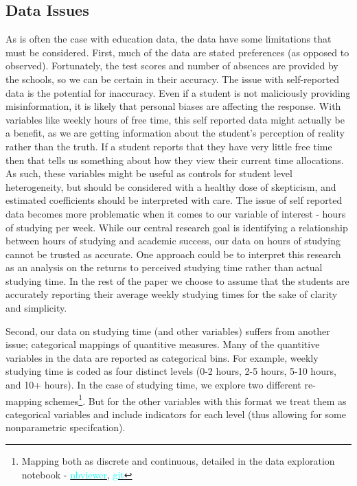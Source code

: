 \documentclass[12pt]{article}
\begin{document}
\subsection{Data Issues} \label{data_issues}
As is often the case with education data, the data have some limitations that must be considered. First, much of the data are stated preferences (as opposed to observed). Fortunately, the test scores and number of absences are provided by the schools, so we can be certain in their accuracy. The issue with self-reported data is the potential for inaccuracy. Even if a student is not maliciously providing misinformation, it is likely that personal biases are affecting the response. With variables like weekly hours of free time, this self reported data might actually be a benefit, as we are getting information about the student's perception of reality rather than the truth. If a student reports that they have very little free time then that tells us something about how they view their current time allocations. As such, these variables might be useful as controls for student level heterogeneity, but should be considered with a healthy dose of skepticism, and estimated coefficients should be interpreted with care. The issue of self reported data becomes more problematic when it comes to our variable of interest - hours of studying per week. While our central research goal is identifying a relationship between hours of studying and academic success, our data on hours of studying cannot be trusted as accurate. One approach could be to interpret this research as an analysis on the returns to perceived studying time rather than actual studying time. In the rest of the paper we choose to assume that the students are accurately reporting their average weekly studying times for the sake of clarity and simplicity.

Second, our data on studying time (and other variables) suffers from another issue; categorical mappings of quantitive measures. Many of the quantitive variables in the data are reported as categorical bins. For example, weekly studying time is coded as four distinct levels (0-2 hours, 2-5 hours, 5-10 hours, and 10+ hours). In the case of studying time, we explore two different re-mapping schemes\footnote{Mapping both as discrete and continuous, detailed in the data exploration notebook - \href{https://nbviewer.jupyter.org/github/nadavtadelis/Reproducible_Metrics/blob/master/data_exploration.ipynb}{\textcolor{cyan}{nbviewer}}, \href{https://github.com/nadavtadelis/Reproducible_Metrics/blob/master/data_exploration.ipynb}{\textcolor{cyan}{git}}}. But for the other variables with this format we treat them as categorical variables and include indicators for each level (thus allowing for some nonparametric specifcation).
\end{document}
